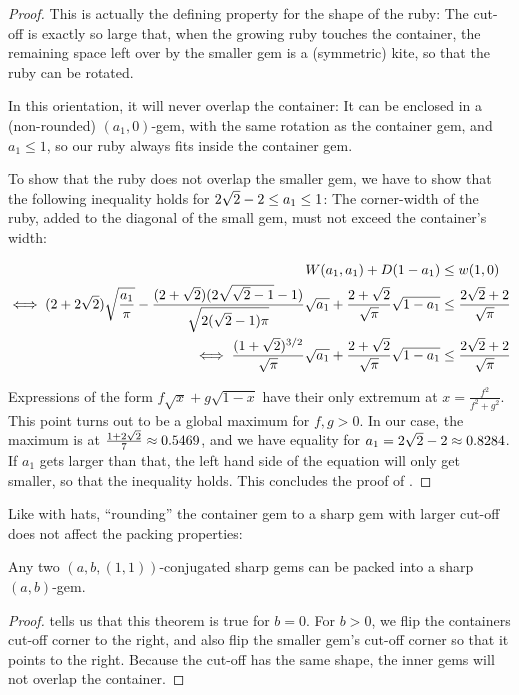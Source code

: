 \documentclass[a4paper,style=print,oneside,bibliography=totoc,nexus,lnum,extramargin]{tubsbook}
\begin{document}
\begin{proof}
    This is actually the defining property for the shape of the ruby: The cut-off is exactly so large that, when the growing ruby touches the container, the remaining space left over by the smaller gem is a (symmetric) kite, so that the ruby can be rotated.

    In this orientation, it will never overlap the container: It can be enclosed in a (non-rounded) $(a_1, 0)$-gem, with the same rotation as the container gem, and $a_1 \le 1$, so our ruby always fits inside the container gem.

    To show that the ruby does not overlap the smaller gem, we have to show that the following inequality holds for $2\sqrt{2}-2 \le a_1 \le 1$: The corner-width of the ruby, added to the diagonal of the small gem, must not exceed the container's width:

    \begin{align*}
        W(a_1,a_1) + D(1-a_1) &\le w(1,0)\\
        \iff (2+2\sqrt{2})\sqrt{\frac{a_1}{\pi}} - \frac{(2+\sqrt{2})(2\sqrt{\sqrt{2}-1}-1)}{\sqrt{2(\sqrt{2}-1)\pi}}\sqrt{a_1} + \frac{2+\sqrt{2}}{\sqrt{\pi}}\sqrt{1-a_1} &\le \frac{2\sqrt{2} + 2}{\sqrt{\pi}}\\
        \iff \frac{(1+\sqrt{2})^{3/2}}{\sqrt{\pi}}\sqrt{a_1} + \frac{2+\sqrt{2}}{\sqrt{\pi}}\sqrt{1-a_1} &\le \frac{2\sqrt{2} + 2}{\sqrt{\pi}}
    \end{align*}

    Expressions of the form $f\sqrt{x} + g\sqrt{1-x}$ have their only extremum at $x = \frac{f^2}{f^2+g^2}$. This point turns out to be a global maximum for $f,g > 0$. In our case, the maximum is at $\frac{1+2\sqrt{2}}{7} \approx 0.5469$, and we have equality for $a_1 = 2\sqrt{2}-2 \approx 0.8284$. If $a_1$ gets larger than that, the left hand side of the equation will only get smaller, so that the inequality holds. This concludes the proof of .
\end{proof}

Like with hats, “rounding” the container gem to a sharp gem with larger cut-off does not affect the packing properties:

\begin{lemma}\label{th:rounded-gems-in-gem}
    Any two $(a, b, (1,1))$-conjugated sharp gems can be packed into a sharp $(a,b)$-gem.
\end{lemma}

\begin{proof}
     tells us that this theorem is true for $b = 0$. 
    For $b > 0$, we flip the containers cut-off corner to the right, and also flip the smaller gem's cut-off corner so that it points to the right. Because the cut-off has the same shape, the inner gems will not overlap the container.
\end{proof}
\end{document}
